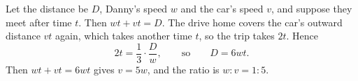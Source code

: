 Let the distance be $D$, Danny's speed $w$ and the car's speed $v$, and suppose they meet after time $t$. Then $wt+vt=D$. The drive home covers the car's outward distance $vt$ again, which takes another time $t$, so the trip takes $2t$. Hence
\[2t=\dfrac13\cdot\dfrac Dw,\qquad\text{so}\qquad D=6wt.\]
Then $wt+vt=6wt$ gives $v=5w$, and the ratio is $w:v=\boxed{1:5}$.
